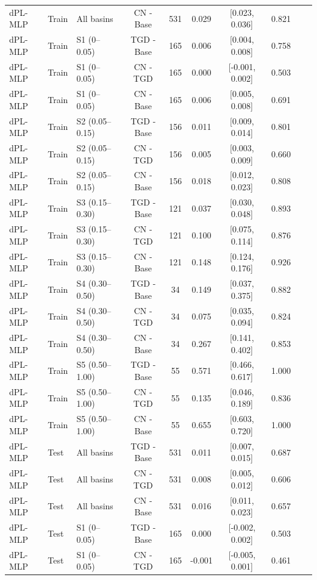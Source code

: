 \begin{table}[t]
\begin{threeparttable}
\begin{tabular}{lllccccccc}
dPL-MLP & Train & All basins & CN - Base & 531 & 0.029 & [0.023, 0.036] & 0.821 \\
dPL-MLP & Train & S1 (0–0.05) & TGD - Base & 165 & 0.006 & [0.004, 0.008] & 0.758 \\
dPL-MLP & Train & S1 (0–0.05) & CN - TGD & 165 & 0.000 & [-0.001, 0.002] & 0.503 \\
dPL-MLP & Train & S1 (0–0.05) & CN - Base & 165 & 0.006 & [0.005, 0.008] & 0.691 \\
dPL-MLP & Train & S2 (0.05–0.15) & TGD - Base & 156 & 0.011 & [0.009, 0.014] & 0.801 \\
dPL-MLP & Train & S2 (0.05–0.15) & CN - TGD & 156 & 0.005 & [0.003, 0.009] & 0.660 \\
dPL-MLP & Train & S2 (0.05–0.15) & CN - Base & 156 & 0.018 & [0.012, 0.023] & 0.808 \\
dPL-MLP & Train & S3 (0.15–0.30) & TGD - Base & 121 & 0.037 & [0.030, 0.048] & 0.893 \\
dPL-MLP & Train & S3 (0.15–0.30) & CN - TGD & 121 & 0.100 & [0.075, 0.114] & 0.876 \\
dPL-MLP & Train & S3 (0.15–0.30) & CN - Base & 121 & 0.148 & [0.124, 0.176] & 0.926 \\
dPL-MLP & Train & S4 (0.30–0.50) & TGD - Base & 34 & 0.149 & [0.037, 0.375] & 0.882 \\
dPL-MLP & Train & S4 (0.30–0.50) & CN - TGD & 34 & 0.075 & [0.035, 0.094] & 0.824 \\
dPL-MLP & Train & S4 (0.30–0.50) & CN - Base & 34 & 0.267 & [0.141, 0.402] & 0.853 \\
dPL-MLP & Train & S5 (0.50–1.00) & TGD - Base & 55 & 0.571 & [0.466, 0.617] & 1.000 \\
dPL-MLP & Train & S5 (0.50–1.00) & CN - TGD & 55 & 0.135 & [0.046, 0.189] & 0.836 \\
dPL-MLP & Train & S5 (0.50–1.00) & CN - Base & 55 & 0.655 & [0.603, 0.720] & 1.000 \\
dPL-MLP & Test & All basins & TGD - Base & 531 & 0.011 & [0.007, 0.015] & 0.687 \\
dPL-MLP & Test & All basins & CN - TGD & 531 & 0.008 & [0.005, 0.012] & 0.606 \\
dPL-MLP & Test & All basins & CN - Base & 531 & 0.016 & [0.011, 0.023] & 0.657 \\
dPL-MLP & Test & S1 (0–0.05) & TGD - Base & 165 & 0.000 & [-0.002, 0.002] & 0.503 \\
dPL-MLP & Test & S1 (0–0.05) & CN - TGD & 165 & -0.001 & [-0.005, 0.001] & 0.461 \\

\end{tabular}
\end{threeparttable}
\end{table}
